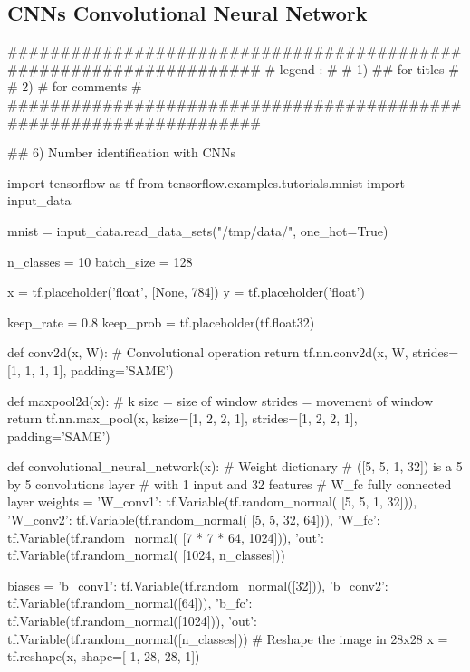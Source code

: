 \documentclass[11pt]{article}
\begin{document}
\subsection{CNNs Convolutional Neural Network}
\begin{python}
###################################################################
# legend :                                                        #
#         1) ## for titles                                        #
#         2) #  for comments                                      #
###################################################################   

## 6) Number identification with CNNs

import tensorflow as tf
from tensorflow.examples.tutorials.mnist import input_data

mnist = input_data.read_data_sets("/tmp/data/", one_hot=True)

n_classes = 10
batch_size = 128

x = tf.placeholder('float', [None, 784])
y = tf.placeholder('float')

keep_rate = 0.8
keep_prob = tf.placeholder(tf.float32)


def conv2d(x, W):
    # Convolutional operation
    return tf.nn.conv2d(x, W,
                        strides=[1, 1, 1, 1], padding='SAME')


def maxpool2d(x):
    # k size = size of window   strides = movement of window
    return tf.nn.max_pool(x, ksize=[1, 2, 2, 1],
                          strides=[1, 2, 2, 1], padding='SAME')


def convolutional_neural_network(x):
    # Weight dictionary
    # ([5, 5, 1, 32]) is a 5 by 5 convolutions layer
    # with 1 input and 32 features
    # W_fc fully connected layer
    weights = {'W_conv1': tf.Variable(tf.random_normal(
        [5, 5, 1, 32])),
               'W_conv2': tf.Variable(tf.random_normal(
                   [5, 5, 32, 64])),
               'W_fc': tf.Variable(tf.random_normal(
                   [7 * 7 * 64, 1024])),
               'out': tf.Variable(tf.random_normal(
                   [1024, n_classes]))}

    biases = {'b_conv1': tf.Variable(tf.random_normal([32])),
              'b_conv2': tf.Variable(tf.random_normal([64])),
              'b_fc': tf.Variable(tf.random_normal([1024])),
              'out': tf.Variable(tf.random_normal([n_classes]))}
    # Reshape the image in 28x28
    x = tf.reshape(x, shape=[-1, 28, 28, 1])


\end{python}
\end{document}
